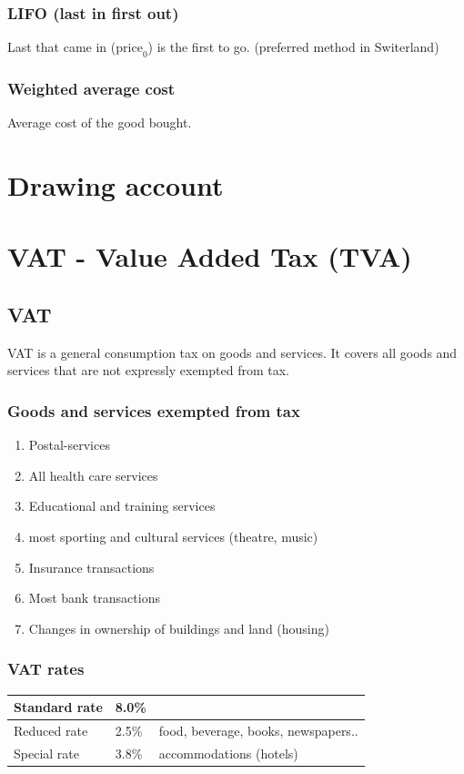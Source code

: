 \documentclass[a4paper] {scrartcl}
\begin{document}
\subsubsection{LIFO (last in first out)}
Last that came in ($\text{price}_0$) is the first to go. (preferred method in Switerland)
\subsubsection{Weighted average cost}
Average cost of the good bought.

\section{Drawing account}



\section{VAT - Value Added Tax (TVA)}
\subsection{VAT}
VAT is a general consumption tax on goods and services. It covers all goods and services that are not expressly exempted from tax.
\subsubsection{Goods and services exempted from tax}
\begin{enumerate}
	\item Postal-services
	\item All health care services
	\item Educational and training services
	\item most sporting and cultural services (theatre, music)
	\item Insurance transactions
	\item Most bank transactions
	\item Changes in ownership of buildings and land (housing)
\end{enumerate}

\subsubsection{VAT rates}
\begin{tabular}{|l|l|l|}
	\hline
	Standard rate & 8.0\% & \\
	\hline
	Reduced rate & 2.5\% & food, beverage, books, newspapers..\\
	\hline
	Special rate & 3.8\%& accommodations (hotels)\\
	\hline
\end{tabular}
\end{document}
